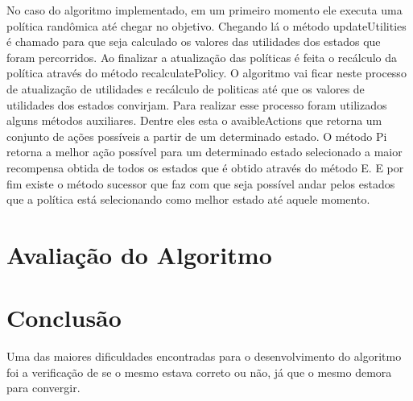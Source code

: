 \documentclass[letterpaper]{article}
\begin{document}
No caso do algoritmo implementado, em um primeiro momento ele executa uma política randômica até chegar no objetivo. Chegando lá o método
updateUtilities é chamado para que seja calculado os valores das utilidades dos estados que foram percorridos. Ao finalizar a atualização das
políticas é feita o recálculo da política através do método recalculatePolicy. O algoritmo vai ficar neste processo de atualização de utilidades
e recálculo de politicas até que os valores de utilidades dos estados convirjam. Para realizar esse processo foram utilizados alguns métodos
auxiliares. Dentre eles esta o avaibleActions que retorna um conjunto de ações possíveis a partir de um determinado estado. O método Pi retorna
a melhor ação possível para um determinado estado selecionado a maior recompensa obtida de todos os estados que é obtido através do método E. E
por fim existe o método sucessor que faz com que seja possível andar pelos estados que a política está selecionando como melhor estado até
aquele momento.

\section{Avaliação do Algoritmo}

\section{Conclusão}

Uma das maiores dificuldades encontradas para o desenvolvimento do algoritmo foi a verificação de se o mesmo estava correto ou não, já que o mesmo
demora para convergir.
\end{document}
